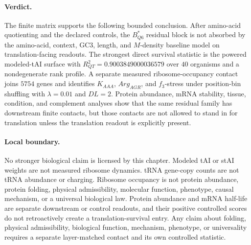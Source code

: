 \paragraph{Verdict.}
The finite matrix supports the following bounded conclusion.  After amino-acid quotienting and the declared controls, the $B^*_{Q6}$ residual block is not absorbed by the amino-acid, context, GC3, length, and $M$-density baseline model on translation-facing readouts.  The strongest direct survival statistic is the powered modeled-tAI surface with $R^2_{QT}=0.9003849000036579$ over $40$ organisms and a nondegenerate rank profile.  A separate measured ribosome-occupancy contact joins $5754$ genes and identifies $K_{AAA}$, $Arg_{AGR}$, and $f_3$-stress under position-bin shuffling with $\lambda=0.01$ and $DL=2$.  Protein abundance, mRNA stability, tissue, condition, and complement analyses show that the same residual family has downstream finite contacts, but those contacts are not allowed to stand in for translation unless the translation readout is explicitly present.

\paragraph{Local boundary.}
No stronger biological claim is licensed by this chapter.  Modeled tAI or stAI weights are not measured ribosome dynamics.  tRNA gene-copy counts are not tRNA abundance or charging.  Ribosome occupancy is not protein abundance, protein folding, physical admissibility, molecular function, phenotype, causal mechanism, or a universal biological law.  Protein abundance and mRNA half-life are separate downstream or control readouts, and their positive controlled scores do not retroactively create a translation-survival entry.  Any claim about folding, physical admissibility, biological function, mechanism, phenotype, or universality requires a separate layer-matched contact and its own controlled statistic.

